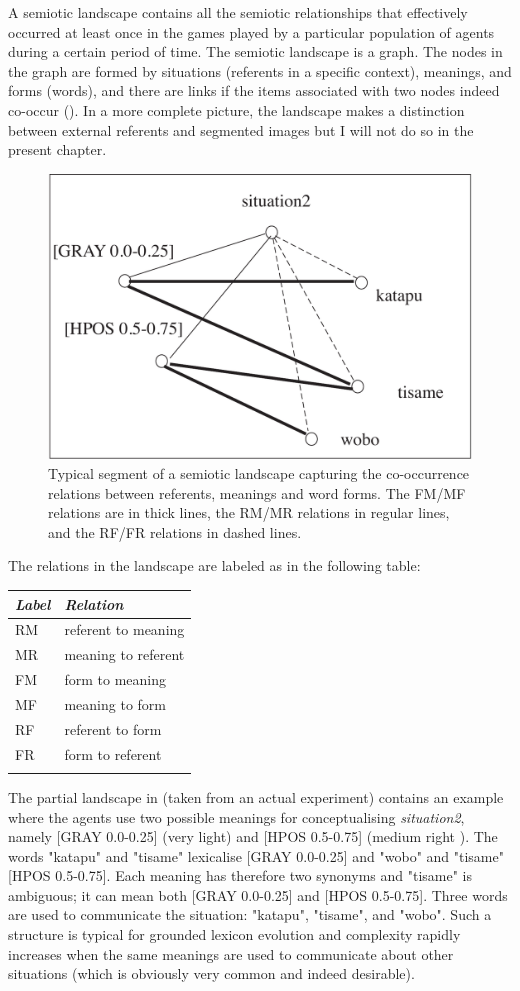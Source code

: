 A semiotic landscape contains all the semiotic relationships
that effectively occurred at least once
in the games played by a particular population of agents
during a certain period of time. 
The semiotic landscape is a graph. The nodes in the
graph are formed by situations (referents in a specific context), 
meanings, and forms (words),
and there are links if the items associated with two nodes
indeed co-occur (). In a more complete
picture, the landscape makes a distinction between 
external referents and segmented images but I will not 
do so in the present chapter. 
\begin{figure}[htbp]
  \centerline{\includegraphics[width=.65\textwidth]{chap7/figs/landscape}}
\caption{ \label{RMF1} Typical segment of a semiotic
landscape capturing the co-occurrence relations between
referents, meanings and word forms. The FM/MF relations are
in thick lines, the RM/MR relations in regular lines, and 
the RF/FR relations in dashed lines.}
\end{figure}
The relations in the landscape are labeled as in 
the following table:
\begin{center}
\begin{tabular}{ l  l  }
\lsptoprule
{\it Label}& {\it Relation } \\ \midrule
RM & referent to meaning \\ \midrule
MR & meaning to referent \\ \midrule
FM & form to meaning\\ \midrule
MF & meaning to form\\ \midrule
RF & referent to form \\ \midrule
FR & form to referent  \\ \midrule
\lspbottomrule
\end{tabular}
\end{center}

The partial landscape in  (taken from
an actual experiment) contains an example where the agents use
two possible meanings for conceptualising {\it situation2}, namely
[GRAY 0.0-0.25] (very light) and [HPOS 0.5-0.75]
(medium right ). The words "katapu" and "tisame" lexicalise
[GRAY 0.0-0.25] and "wobo" and "tisame" [HPOS 0.5-0.75]. 
Each meaning has therefore two synonyms and "tisame" is 
ambiguous; it can mean both [GRAY 0.0-0.25]
and [HPOS 0.5-0.75]. Three words
are used to communicate the situation: "katapu", "tisame", 
and "wobo". Such a structure is typical for grounded
lexicon evolution and complexity rapidly increases when the
same meanings are used to communicate about other
situations (which is obviously very common and indeed desirable). 

